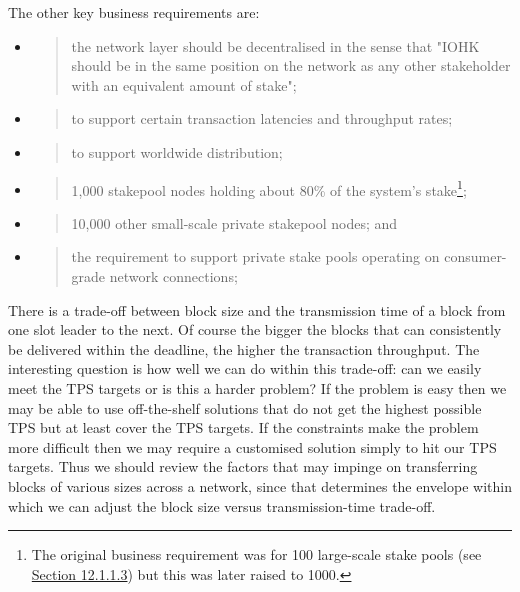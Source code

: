 \documentclass[]{article}
\begin{document}
The other key business requirements are:

\begin{itemize}
\item
  \begin{quote}
  the network layer should be decentralised in the sense that "IOHK
  should be in the same position on the network as any other stakeholder
  with an equivalent amount of stake";
  \end{quote}
\item
  \begin{quote}
  to support certain transaction latencies and throughput rates;
  \end{quote}
\item
  \begin{quote}
  to support worldwide distribution;
  \end{quote}
\item
  \begin{quote}
  1,000 stakepool nodes holding about 80\% of the system's
  stake\footnote{The original business requirement was for 100
    large-scale stake pools (see
    \protect\hyperlink{participate-in-network-as-a-large-stakeholder}{Section
    12.1.1.3}) but this was later raised to 1000.};
  \end{quote}
\item
  \begin{quote}
  10,000 other small-scale private stakepool nodes; and
  \end{quote}
\item
  \begin{quote}
  the requirement to support private stake pools operating on
  consumer-grade network connections;
  \end{quote}
\end{itemize}

There is a trade-off between block size and the transmission time of a
block from one slot leader to the next. Of course the bigger the blocks
that can consistently be delivered within the deadline, the higher the
transaction throughput. The interesting question is how well we can do
within this trade-off: can we easily meet the TPS targets or is this a
harder problem? If the problem is easy then we may be able to use
off-the-shelf solutions that do not get the highest possible TPS but at
least cover the TPS targets. If the constraints make the problem more
difficult then we may require a customised solution simply to hit our
TPS targets. Thus we should review the factors that may impinge on
transferring blocks of various sizes across a network, since that
determines the envelope within which we can adjust the block size versus
transmission-time trade-off.
\end{document}
